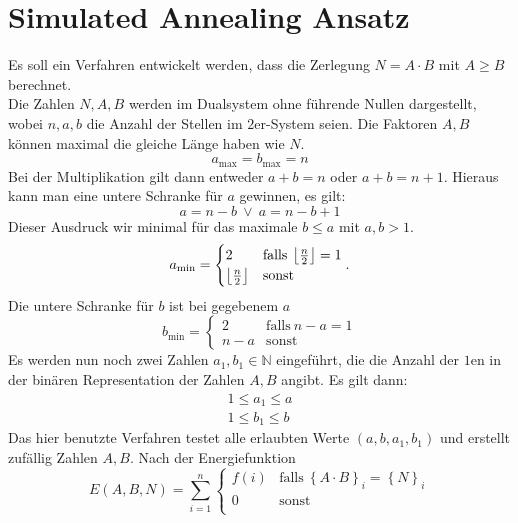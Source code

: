 \section{Simulated Annealing Ansatz}
Es soll ein Verfahren entwickelt werden, dass die Zerlegung $N=A\cdot B$ mit $A\geq B$ berechnet.\\
Die Zahlen $N,A,B$ werden im Dualsystem ohne führende Nullen dargestellt, wobei $n, a, b$ die Anzahl der Stellen im $2$er-System seien. Die Faktoren $A, B$ können maximal die gleiche Länge haben wie $N$.
\begin{equation*}
		a_\mathrm{max}=b_\mathrm{max}=n
\end{equation*}
Bei der Multiplikation gilt dann entweder $a+b=n$ oder $a+b=n+1$. Hieraus kann man eine untere Schranke für $a$ gewinnen, es gilt:
\begin{equation*}
		a=n-b \:\vee\: a=n-b+1
\end{equation*}
Dieser Ausdruck wir minimal für das maximale $b \leq a$ mit $a,b>1$.
\begin{equation*}
		a_\mathrm{min}=\begin{cases}
						2 & \mathrm{falls}\:\left\lfloor\frac{n}{2}\right\rfloor = 1 \\
						\left\lfloor\frac{n}{2}\right\rfloor & \mathrm{sonst}
				\end{cases}.
\end{equation*}
Die untere Schranke für $b$ ist bei gegebenem $a$
\begin{equation*}
		b_\mathrm{min}=\begin{cases}
						2 & \mathrm{falls}\:n-a=1 \\
						n-a & \mathrm{sonst}
				\end{cases}
\end{equation*}
Es werden nun noch zwei Zahlen $a_1, b_1\in\mathbb{N}$ eingeführt, die die Anzahl der $1$en in der binären Representation der Zahlen $A, B$ angibt. Es gilt dann:
\begin{align*}
		1\leq a_1\leq a \\
		1\leq b_1\leq b
\end{align*}
Das hier benutzte Verfahren testet alle erlaubten Werte $\left(a,b,a_1,b_1\right)$ und erstellt zufällig Zahlen $A,B$. Nach der Energiefunktion
\begin{equation*}
		E\left(A,B,N\right)=\sum\limits_{i=1}^n\begin{cases}
		  		f\left(i\right) & \mathrm{falls}\:{\left\{A\cdot B\right\}}_i={\left\{N\right\}}_i \\
						0 & \mathrm{sonst}\\
				\end{cases}
\end{equation*}
